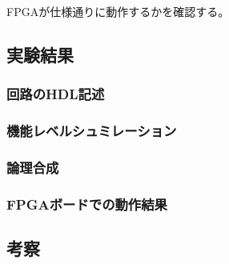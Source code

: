 FPGAが仕様通りに動作するかを確認する。

\subsection{実験結果}
\subsubsection{回路のHDL記述}
\subsubsection{機能レベルシュミレーション}
\subsubsection{論理合成}
\subsubsection{FPGAボードでの動作結果}
\subsection{考察}
